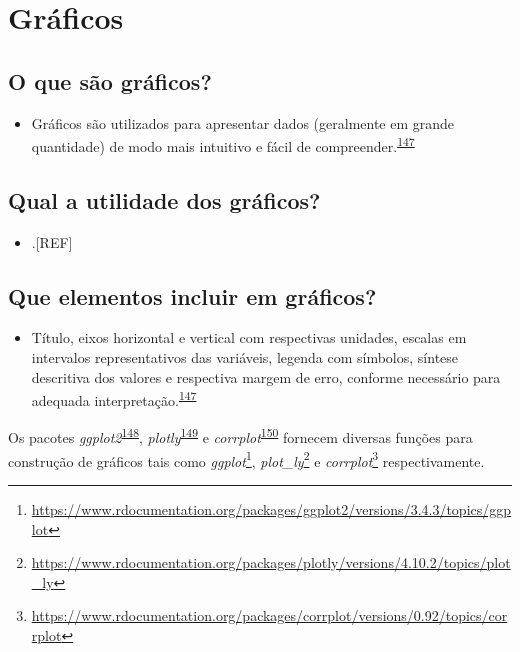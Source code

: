 \documentclass[
  a4paper,
]{book}
\providecommand{\tightlist}{%
  \setlength{\itemsep}{0pt}\setlength{\parskip}{0pt}}
\renewcommand{\href}[2]{#2\footnote{\url{#1}}}
\newenvironment{infobox}[1]
  {
  \begin{itemize}
  \renewcommand{\labelitemi}{
    \raisebox{-.7\height}[0pt][0pt]{
      {\setkeys{Gin}{width=3em,keepaspectratio}
        \texttt{[image: \#1]}}
    }
  }
  \setlength{\fboxsep}{1em}
  \begin{blackbox}
  \item
  }
  {
  \end{blackbox}
  \end{itemize}
  }
\begin{document}
\hypertarget{graficos}{%
\section{Gráficos}\label{graficos}}

\hypertarget{o-que-suxe3o-gruxe1ficos}{%
\subsection{O que são gráficos?}\label{o-que-suxe3o-gruxe1ficos}}

\begin{itemize}
\tightlist
\item
  Gráficos são utilizados para apresentar dados (geralmente em grande quantidade) de modo mais intuitivo e fácil de compreender.\textsuperscript{\protect\hyperlink{ref-Park2022}{147}}
\end{itemize}

\hypertarget{qual-a-utilidade-dos-gruxe1ficos}{%
\subsection{Qual a utilidade dos gráficos?}\label{qual-a-utilidade-dos-gruxe1ficos}}

\begin{itemize}
\tightlist
\item
  .{[}REF{]}
\end{itemize}

\hypertarget{que-elementos-incluir-em-gruxe1ficos}{%
\subsection{Que elementos incluir em gráficos?}\label{que-elementos-incluir-em-gruxe1ficos}}

\begin{itemize}
\tightlist
\item
  Título, eixos horizontal e vertical com respectivas unidades, escalas em intervalos representativos das variáveis, legenda com símbolos, síntese descritiva dos valores e respectiva margem de erro, conforme necessário para adequada interpretação.\textsuperscript{\protect\hyperlink{ref-Park2022}{147}}
\end{itemize}

\begin{infobox}{images/Rlogo}
Os pacotes \emph{ggplot2}\textsuperscript{\protect\hyperlink{ref-ggplot2}{148}}, \emph{plotly}\textsuperscript{\protect\hyperlink{ref-plotly}{149}} e \emph{corrplot}\textsuperscript{\protect\hyperlink{ref-corrplot}{150}} fornecem diversas funções para construção de gráficos tais como \href{https://www.rdocumentation.org/packages/ggplot2/versions/3.4.3/topics/ggplot}{\emph{ggplot}}, \href{https://www.rdocumentation.org/packages/plotly/versions/4.10.2/topics/plot_ly}{\emph{plot\_ly}} e \href{https://www.rdocumentation.org/packages/corrplot/versions/0.92/topics/corrplot}{\emph{corrplot}} respectivamente.

\end{infobox}
\end{document}
